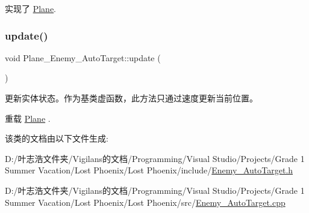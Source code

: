 实现了 \hyperlink{class_plane_af999499b5e79309d94004e8d012fe9c4}{Plane}.

\mbox{\label{class_plane___enemy___auto_target_acae2a6f38bdc71d17188e2b7711f4d5b}} 
\subsubsection{\texorpdfstring{update()}{update()}}
{\footnotesize\ttfamily void Plane\+\_\+\+Enemy\+\_\+\+Auto\+Target\+::update (\begin{DoxyParamCaption}{ }\end{DoxyParamCaption})\hspace{0.3cm}{\ttfamily [virtual]}}



更新实体状态。作为基类虚函数，此方法只通过速度更新当前位置。 



重载 \hyperlink{class_plane_a7fbb07f76503fe057772e01f542afc32}{Plane} .



该类的文档由以下文件生成\+:\begin{DoxyCompactItemize}
\item 
D\+:/叶志浩文件夹/\+Vigilans的文档/\+Programming/\+Visual Studio/\+Projects/\+Grade 1 Summer Vacation/\+Lost Phoenix/\+Lost Phoenix/include/\hyperlink{_enemy___auto_target_8h}{Enemy\+\_\+\+Auto\+Target.\+h}\item 
D\+:/叶志浩文件夹/\+Vigilans的文档/\+Programming/\+Visual Studio/\+Projects/\+Grade 1 Summer Vacation/\+Lost Phoenix/\+Lost Phoenix/src/\hyperlink{_enemy___auto_target_8cpp}{Enemy\+\_\+\+Auto\+Target.\+cpp}\end{DoxyCompactItemize}
